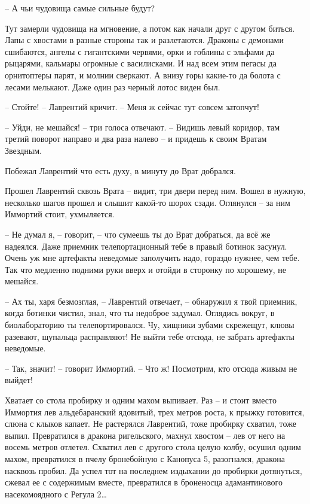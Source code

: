 \documentclass[ebook,oneside,final,openright]{memoir}
\begin{document}
– А чьи чудовища самые сильные будут?\par
Тут замерли чудовища на мгновение, а потом как начали друг с другом биться. Лапы с хвостами в разные стороны так и разлетаются. Драконы с демонами сшибаются, ангелы с гигантскими червями, орки и гоблины с эльфами да рыцарями, кальмары огромные с василисками. И над всем этим пегасы да орнитоптеры парят, и молнии сверкают. А внизу горы какие-то да болота с лесами мелькают. Даже один раз черный лотос виден был. \par
– Стойте! – Лаврентий кричит. – Меня ж сейчас тут совсем затопчут!\par
– Уйди, не мешайся! – три голоса отвечают. – Видишь левый коридор, там третий поворот направо и два раза налево – и придешь к своим Вратам Звездным.\par
\par
Побежал Лаврентий что есть духу, в минуту до Врат добрался.\par
\par
Прошел Лаврентий сквозь Врата – видит, три двери перед ним. Вошел в нужную, несколько шагов прошел и слышит какой-то шорох сзади. Оглянулся – за ним Иммортий стоит, ухмыляется. \par
\par
– Не думал я, – говорит, – что сумеешь ты до Врат добраться, да всё же надеялся. Даже приемник телепортационный тебе в правый ботинок засунул. Очень уж мне артефакты неведомые заполучить надо, гораздо нужнее, чем тебе. Так что медленно подними руки вверх и отойди в сторонку по хорошему, не мешайся.\par
– Ах ты, харя безмозглая, – Лаврентий отвечает, – обнаружил я твой приемник, когда ботинки чистил, знал, что ты недоброе задумал. Оглядись вокруг, в биолабораторию ты телепортировался. Чу, хищники зубами скрежещут, клювы разевают, щупальца расправляют! Не выйти тебе отсюда, не забрать артефакты неведомые.\par
– Так, значит! – говорит Иммортий. – Что ж! Посмотрим, кто отсюда живым не выйдет!\par
\par
Хватает со стола пробирку и одним махом выпивает. Раз – и стоит вместо Иммортия лев альдебаранский ядовитый, трех метров роста, к прыжку готовится, слюна с клыков капает. Не растерялся Лаврентий, тоже пробирку схватил, тоже выпил. Превратился в дракона ригельского, махнул хвостом – лев от него на восемь метров отлетел. Схватил лев с другого стола целую колбу, осушил одним махом, превратился в пчелу бронебойную с Канопуса 5, разогнался, дракона насквозь пробил. Да успел тот на последнем издыхании до пробирки дотянуться, сжевал ее с содержимым вместе, превратился в броненосца адамантинового насекомоядного с Регула 2…\par
\end{document}
